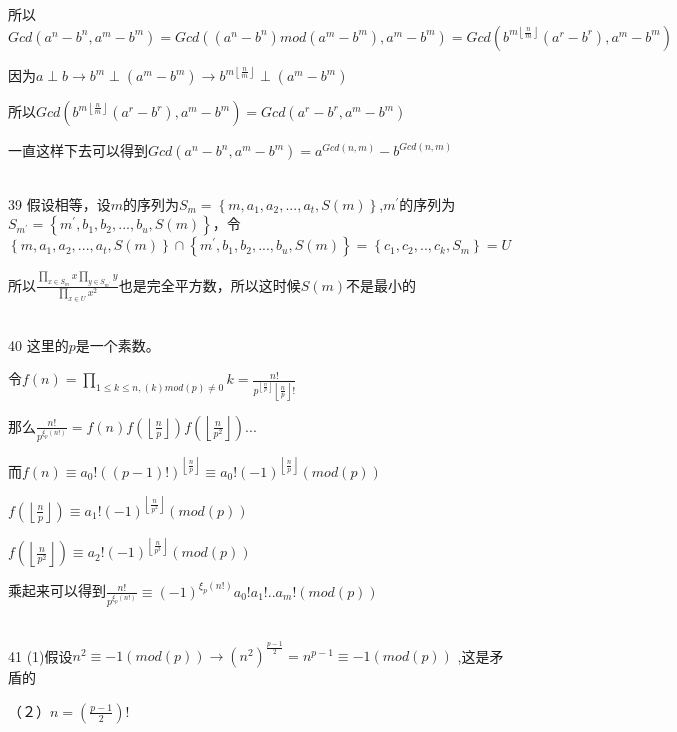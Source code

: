 \documentclass[onecolumn]{article}
\begin{document}
所以$Gcd(a^{n}-b^{n},a^{m}-b^{m})=Gcd((a^{n}-b^{n})mod(a^{m}-b^{m}),a^{m}-b^{m})=Gcd(b^{m\left \lfloor \frac{n}{m} \right \rfloor}(a^{r}-b^{r}),a^{m}-b^{m})$ \par
因为$a\perp b\rightarrow b^{m}\perp (a^{m}-b^{m})\rightarrow b^{m\left \lfloor \frac{n}{m} \right \rfloor}\perp (a^{m}-b^{m})$ \par
所以$Gcd(b^{m\left \lfloor \frac{n}{m} \right \rfloor}(a^{r}-b^{r}),a^{m}-b^{m})=Gcd(a^{r}-b^{r},a^{m}-b^{m})$ \par
一直这样下去可以得到$Gcd(a^{n}-b^{n},a^{m}-b^{m})=a^{Gcd(n,m)}-b^{Gcd(n,m)}$ \par
~\\
39 假设相等，设$m$的序列为$S_{m}=\left \{ m,a_{1},a_{2},...,a_{t},S(m) \right \}$,$m^{'}$的序列为$S_{m^{'}}=\left \{ m^{'},b_{1},b_{2},...,b_{u},S(m) \right \}$，令$\left \{ m,a_{1},a_{2},...,a_{t},S(m) \right \}\cap \left \{ m^{'},b_{1},b_{2},...,b_{u},S(m) \right \}=\left \{ c_{1},c_{2},..,c_{k},S_{m} \right \}=U$ \par
所以$\frac{\prod_{x\in S_{m}}x\prod_{y\in S_{m^{'}}}y}{\prod_{x\in U}x^{2}}$也是完全平方数，所以这时候$S(m)$不是最小的 \par
~\\
40 这里的$p$是一个素数。 \par
令$f(n)=\prod_{1\leq k \leq n,(k)mod(p)\ne 0}k=\frac{n!}{p^{\left \lfloor \frac{n}{p} \right \rfloor}\left \lfloor \frac{n}{p} \right \rfloor!}$ \par
那么$\frac{n!}{p^{\xi _{p}(n!)}}=f(n)f(\left \lfloor \frac{n}{p} \right \rfloor)f(\left \lfloor \frac{n}{p^{2}} \right \rfloor)...$ \par
而$f(n)\equiv a_{0}!((p-1)!)^{\left \lfloor \frac{n}{p} \right \rfloor}\equiv a_{0}!(-1)^{\left \lfloor \frac{n}{p} \right \rfloor}(mod(p))$ \par
$f(\left \lfloor \frac{n}{p} \right \rfloor)\equiv a_{1}!(-1)^{\left \lfloor \frac{n}{p^{2}} \right \rfloor}(mod(p))$ \par
$f(\left \lfloor \frac{n}{p^{2}} \right \rfloor)\equiv a_{2}!(-1)^{\left \lfloor \frac{n}{p^{3}} \right \rfloor}(mod(p))$ \par
乘起来可以得到$\frac{n!}{p^{\xi _{p}(n!)}}\equiv (-1)^{\xi _{p}(n!)}a_{0}!a_{1}!..a_{m}!(mod(p))$ \par
~\\
41 (1)假设$n^{2}\equiv -1(mod(p))\rightarrow (n^{2})^{\frac{p-1}{2}}=n^{p-1}\equiv -1(mod(p))$ ,这是矛盾的 \par
（２）$n=(\frac{p-1}{2})!$ \par
\end{document}
